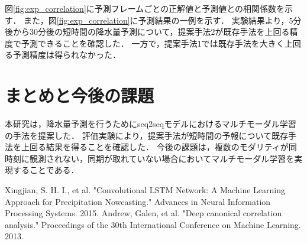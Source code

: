 \documentclass[a4j,twoside]{jarticle}
\begin{document}
\begin{論文概要}
\begin{figure}[h]
	\label{fig:the_model_dcca}
\end{figure}
図\ref{fig:exp_correlation}に予測フレームごとの正解値と予測値との相関係数を示す．
また，図\ref{fig:exp_correlation}に予測結果の一例を示す．
実験結果より，5分後から30分後の短時間の降水量予測について，提案手法2が既存手法を上回る精度で予測できることを確認した．
一方で，提案手法1では既存手法を大きく上回る予測精度は得られなかった．
%
\section{まとめと今後の課題}
%
本研究は，降水量予測を行うためにseq2seqモデルにおけるマルチモーダル学習の手法を提案した．
評価実験により，提案手法が短時間の予報について既存手法を上回る結果を得ることを確認した．
今後の課題は，複数のモダリティが同時刻に観測されない，同期が取れていない場合においてマルチモーダル学習を実現することである．
%
\begin{thebibliography}{1}%
Xingjian, S. H. I., et al. "Convolutional LSTM Network: A Machine Learning Approach for Precipitation Nowcasting." Advances in Neural Information Processing Systems. 2015.
Andrew, Galen, et al. "Deep canonical correlation analysis." Proceedings of the 30th International Conference on Machine Learning. 2013.
\end{thebibliography}
%
\clearpage                       %
\end{論文概要}                   %
\end{document}
